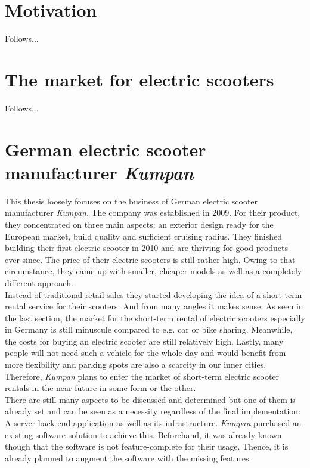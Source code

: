 \documentclass[12pt,a4paper]{report}
\begin{document}
\section{Motivation}

Follows...


\section{The market for electric scooters}

Follows...


\section{German electric scooter manufacturer \emph{Kumpan}}

This thesis loosely focuses on the business of German electric scooter manufacturer \emph{Kumpan}.
The company was established in 2009. For their product, they concentrated on three main aspects:
an exterior design ready for the European market, build quality and sufficient cruising radius.
They finished building their first electric scooter in 2010 and are thriving for good products ever since.
The price of their electric scooters is still rather high. Owing to that circumstance,
they came up with smaller, cheaper models as well as a completely different approach.\\
Instead of traditional retail sales they started developing the idea of a
short-term rental service for their scooters. And from many angles it makes sense:
As seen in the last section, the market for the short-term rental of electric scooters
especially in Germany is still minuscule compared to e.g. car or bike sharing.
Meanwhile, the costs for buying an electric scooter are still relatively high.
Lastly, many people will not need such a vehicle for the whole day and would benefit
from more flexibility and parking spots are also a scarcity in our inner cities.
Therefore, \emph{Kumpan} plans to enter the market of short-term electric scooter rentals
in the near future in some form or the other.\\
There are still many aspects to be discussed and determined but one of them
is already set and can be seen as a necessity regardless of the final implementation:
A server back-end application as well as its infrastructure.
\emph{Kumpan} purchased an existing software solution to achieve this.
Beforehand, it was already known though that the software is not feature-complete
for their usage. Thence, it is already planned to augment the software with the missing
features.
\end{document}

